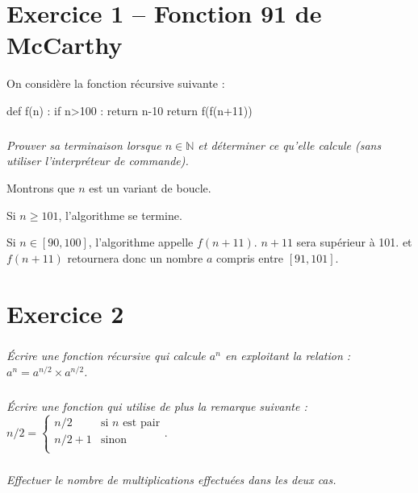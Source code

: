 \documentclass[10pt,fleqn]{book} %
\begin{document}

\vspace{10cm}
\pagestyle{fancy}
\thispagestyle{plain}

\setcounter{secnumdepth}{5}
\def\columnseprulecolor{\color{ocre}}
\setlength{\columnseprule}{0.4pt} 

\ifprof
\else
\begin{multicols}{2}
\fi

\section*{Exercice 1 -- Fonction 91 de McCarthy}
On considère la fonction récursive suivante : 
\begin{py}
\begin{python}
def f(n) :
    if n>100 : 
        return n-10
    return f(f(n+11))
\end{python}
\end{py}

\subparagraph*{} \textit{Prouver sa terminaison lorsque $n\in\mathbb{N}$ et déterminer ce qu'elle calcule (sans utiliser l'interpréteur de commande).}
\ifprof
\begin{corrige}
Montrons que $n$ est un variant de boucle.

Si $n\geq 101$, l'algorithme se termine. 

Si $n\in\left[90, 100\right]$, l'algorithme appelle $f(n+11)$.  $n+11$ sera supérieur à 101. 
 et  $f(n+11)$ retournera donc un nombre $a$ compris entre $\left[91, 101\right]$. 


\end{corrige}
\else
\fi

\section*{Exercice 2}
\setcounter{subparagraph}{0}
\subparagraph{}
\textit{Écrire une fonction récursive qui calcule $a^n$ en exploitant la relation : $a^n=a^{n/2}\times a^{n/2}$.}
\subparagraph{}
\textit{Écrire une fonction qui utilise de plus la remarque suivante :}
$n/2 = \left\{ 
\begin{array}{ll} 
n/2 & \text{si }n \text{ est pair} \\
n/2+1 & \text{sinon}\\
\end{array}
\right.
$.
\subparagraph{}
\textit{Effectuer le nombre de multiplications effectuées dans les deux cas.}



\end{multicols}
\end{document}

